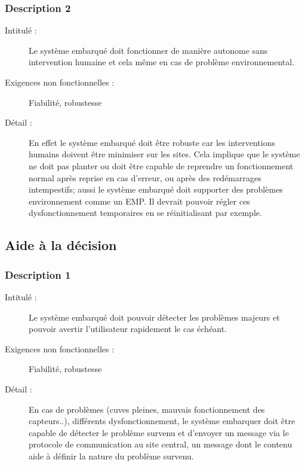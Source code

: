 \subsubsection {Description 2}
\begin{description}
           \item[Intitulé :] Le système embarqué doit fonctionner de manière autonome sans intervention humaine et cela même en cas de problème
environnemental.
           \item[Exigences non fonctionnelles :]Fiabilité, robustesse
           \item[Détail :] En effet le système embarqué doit être robuste car les interventions humains doivent être minimiser sur
les sites. Cela implique que le système ne doit pas planter ou doit être capable de reprendre un fonctionnement normal
après reprise en cas d'erreur, ou après des redémarrages intempestifs; aussi le système embarqué doit supporter des 
problèmes environnement comme un EMP. Il devrait pouvoir régler ces dysfonctionnement temporaires en se 
réinitialisant par exemple.
\end{description}

 \subsection {Aide à la décision}
 \subsubsection {Description 1}
\begin{description}
           \item[Intitulé :] Le système embarqué doit pouvoir détecter les problèmes majeurs et pouvoir avertir l'utilisateur rapidement le cas
échéant.
           \item[Exigences non fonctionnelles :] Fiabilité, robustesse
           \item[Détail :] En cas de problèmes (cuves pleines, mauvais fonctionnement des capteurs..), différents dysfonctionnement,
le système embarquer doit être capable de détecter le problème survenu et d'envoyer un message via le protocole de communication au site central, un message dont le contenu aide à définir la nature du problème survenu.
\end{description}

